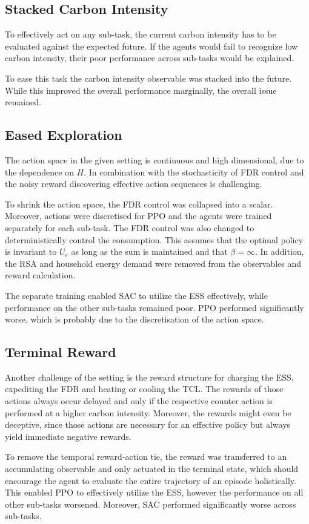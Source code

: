 \subsection{Stacked Carbon Intensity}
To effectively act on any sub-task, the current carbon intensity has to be evaluated against the expected future. If the agents would fail to recognize low carbon intensity, their poor performance across sub-tasks would be explained.
\par
To ease this task the carbon intensity observable was stacked into the future. While this improved the overall performance marginally, the overall issue remained.


\subsection{Eased Exploration}
The action space in the given setting is continuous and high dimensional, due to the dependence on $H$. In combination with the stochasticity of FDR control and the noisy reward discovering effective action sequences is challenging.
\par
To shrink the action space, the FDR control was collapsed into a scalar. Moreover, actions were discretised for PPO and the agents were trained separately for each sub-task. The FDR control was also changed to deterministically control the consumption. This assumes that the optimal policy is invariant to $U_e$ as long as the sum is maintained and that $\beta = \infty$. In addition, the RSA and household energy demand were removed from the observables and reward calculation.
\par
The separate training enabled SAC to utilize the ESS effectively, while performance on the other sub-tasks remained poor. PPO performed significantly worse, which is probably due to the discretisation of the action space.


\subsection{Terminal Reward}
Another challenge of the setting is the reward structure for charging the ESS, expediting the FDR and heating or cooling the TCL. The rewards of those actions always occur delayed and only if the respective counter action is performed at a higher carbon intensity. Moreover, the rewards might even be deceptive, since those actions are necessary for an effective policy but always yield immediate negative rewards.
\par
To remove the temporal reward-action tie, the reward was transferred to an accumulating observable and only actuated in the terminal state, which should encourage the agent to evaluate the entire trajectory of an episode holistically. This enabled PPO to effectively utilize the ESS, however the performance on all other sub-tasks worsened. Moreover, SAC performed significantly worse across sub-tasks.